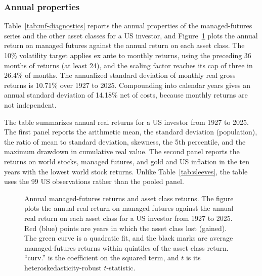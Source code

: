 \subsubsection{Annual properties}
\label{app:mf-annual}

Table~\ref{tab:mf-diagnostics} reports the annual properties of the managed-futures series and the other
asset classes for a US investor, and Figure~\ref{fig:mf-convexity} plots the annual return on managed
futures against the annual return on each asset class. The 10\% volatility target applies ex ante to
monthly returns, using the preceding 36 months of returns (at least 24), and the scaling factor reaches
its cap of three in 26.4\% of months. The annualized standard deviation of monthly real gross returns is
10.71\% over 1927 to 2025. Compounding into calendar years gives an annual standard deviation of 14.18\%
net of costs, because monthly returns are not independent.

\begin{table}[p]
\centering
\caption{Annual properties of the managed-futures series and other asset classes}
\label{tab:mf-diagnostics}
\begin{minipage}{\linewidth}\small The table summarizes annual real returns for a US investor from 1927 to
2025. The first panel reports the arithmetic mean, the standard deviation (population), the ratio of mean
to standard deviation, skewness, the 5th percentile, and the maximum drawdown in cumulative real value.
The second panel reports the returns on world stocks, managed futures, and gold and US inflation in the
ten years with the lowest world stock returns. Unlike Table~\ref{tab:sleeves}, the table uses the 99 US
observations rather than the pooled panel.\end{minipage}
\medskip

\small

\end{table}

\begin{figure}[p]
\centering
\resizebox{\linewidth}{!}{}
\caption{Annual managed-futures returns and asset class returns. The figure plots the annual real return
on managed futures against the annual real return on each asset class for a US investor from 1927 to 2025.
Red (blue) points are years in which the asset class lost (gained). The green curve is a quadratic fit, and
the black marks are average managed-futures returns within quintiles of the asset class return. ``curv.''
is the coefficient on the squared term, and $t$ is its heteroskedasticity-robust $t$-statistic.}
\label{fig:mf-convexity}
\end{figure}

